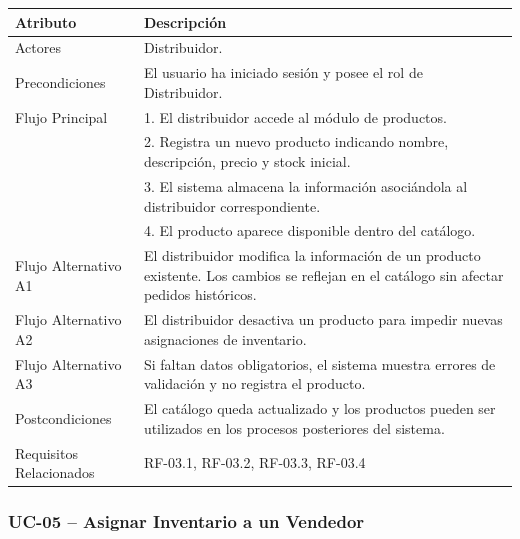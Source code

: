 \documentclass[12pt,a4paper]{report}
\begin{document}
\begin{longtable}{|p{4cm}|p{10cm}|}
\hline
\textbf{Atributo} & \textbf{Descripción} \\ \hline
Actores & Distribuidor. \\ \hline
Precondiciones & El usuario ha iniciado sesión y posee el rol de Distribuidor. \\ \hline
Flujo Principal &
1. El distribuidor accede al módulo de productos.\\
& 2. Registra un nuevo producto indicando nombre, descripción, precio y stock inicial.\\
& 3. El sistema almacena la información asociándola al distribuidor correspondiente.\\
& 4. El producto aparece disponible dentro del catálogo. \\ \hline
Flujo Alternativo A1 & El distribuidor modifica la información de un producto existente. Los cambios se reflejan en el catálogo sin afectar pedidos históricos. \\ \hline
Flujo Alternativo A2 & El distribuidor desactiva un producto para impedir nuevas asignaciones de inventario. \\ \hline
Flujo Alternativo A3 & Si faltan datos obligatorios, el sistema muestra errores de validación y no registra el producto. \\ \hline
Postcondiciones & El catálogo queda actualizado y los productos pueden ser utilizados en los procesos posteriores del sistema. \\ \hline
Requisitos Relacionados & RF-03.1, RF-03.2, RF-03.3, RF-03.4 \\ \hline
\end{longtable}


\subsubsection{UC-05 -- Asignar Inventario a un Vendedor}
\end{document}
